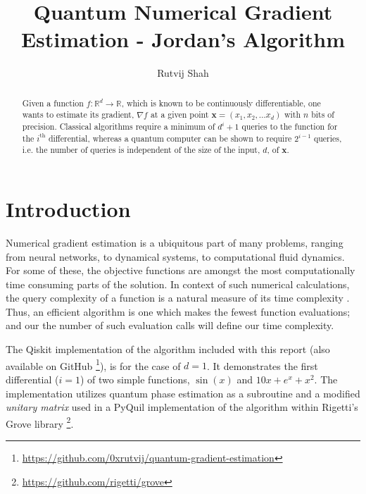 \documentclass{article}
\begin{document}
\title{Quantum Numerical Gradient Estimation - Jordan's Algorithm}

\author{Rutvij Shah}

\maketitle              %


\begin{abstract}

  Given a function \(f: \mathbb{R}^d \rightarrow \mathbb{R}\), which is known to be
  continuously differentiable, one wants to estimate its gradient, \(\nabla f\) at
  a given point \(\mathbf{x} = (x_1, x_2, \ldots x_d)\) with \(n\) bits of precision.
  Classical algorithms require a minimum of \(d^i + 1\) queries to the function
  for the \(i^{\text{th}}\) differential, whereas a quantum computer can be shown to
  require \(2^{i - 1}\) queries, i.e. the number of queries is independent of the size
  of the input, \(d\), of $\mathbf{x}$.


\end{abstract}






\section{Introduction}

Numerical gradient estimation is a ubiquitous part of many problems, ranging from neural
networks, to dynamical systems, to computational fluid dynamics. For some of these, the
objective functions are amongst the most computationally time consuming parts of the solution.
In context of such numerical calculations, the query complexity of a function is a natural
measure of its time complexity \cite{quant-ph/0405146}. Thus, an efficient algorithm is one which makes the fewest
function evaluations; and our the number of such evaluation calls will define our time complexity.


The Qiskit implementation of the algorithm included with this report (also available on GitHub \footnote[1]{\url{https://github.com/0xrutvij/quantum-gradient-estimation}}),
is for the case of \(d = 1\). It demonstrates the first differential (\(i = 1\)) of two simple functions,
\(\sin(x)\) and \(10 x + e^{x}  + x^2\). The implementation utilizes quantum phase estimation as
a subroutine and a modified \textit{unitary matrix} used in a PyQuil implementation of the algorithm
within Rigetti's Grove library \footnote[2]{\url{https://github.com/rigetti/grove}}.
\end{document}
